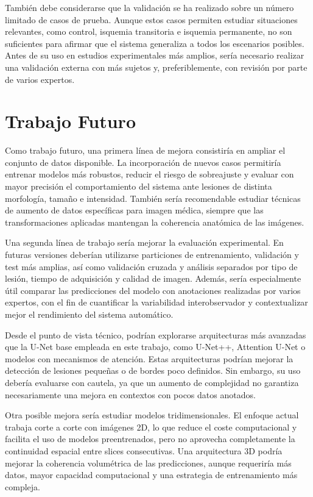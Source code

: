 También debe considerarse que la validación se ha realizado sobre un número limitado de casos de prueba. Aunque estos casos permiten estudiar situaciones relevantes, como
control, isquemia transitoria e isquemia permanente, no son suficientes para afirmar que el sistema generaliza a todos los escenarios posibles. Antes de su uso en estudios 
experimentales más amplios, sería necesario realizar una validación externa con más sujetos y, preferiblemente, con revisión por parte de varios expertos.

\section{Trabajo Futuro}

Como trabajo futuro, una primera línea de mejora consistiría en ampliar el conjunto de datos disponible. La incorporación de nuevos casos permitiría entrenar modelos más 
robustos, reducir el riesgo de sobreajuste y evaluar con mayor precisión el comportamiento del sistema ante lesiones de distinta morfología, tamaño e intensidad. También 
sería recomendable estudiar técnicas de aumento de datos específicas para imagen médica, siempre que las transformaciones aplicadas mantengan la coherencia anatómica de las imágenes.

Una segunda línea de trabajo sería mejorar la evaluación experimental. En futuras versiones deberían utilizarse particiones de entrenamiento, validación y test más amplias, 
así como validación cruzada y análisis separados por tipo de lesión, tiempo de adquisición y calidad de imagen. Además, sería especialmente útil comparar las predicciones del
modelo con anotaciones realizadas por varios expertos, con el fin de cuantificar la variabilidad interobservador y contextualizar mejor el rendimiento del sistema automático.

Desde el punto de vista técnico, podrían explorarse arquitecturas más avanzadas que la U-Net base empleada en este trabajo, como U-Net++, Attention U-Net o modelos con 
mecanismos de atención. Estas arquitecturas podrían mejorar la detección de lesiones pequeñas o de bordes poco definidos. Sin embargo, su uso debería evaluarse con cautela, 
ya que un aumento de complejidad no garantiza necesariamente una mejora en contextos con pocos datos anotados.

Otra posible mejora sería estudiar modelos tridimensionales. El enfoque actual trabaja corte a corte con imágenes 2D, lo que reduce el coste computacional y facilita el uso
de modelos preentrenados, pero no aprovecha completamente la continuidad espacial entre slices consecutivas. Una arquitectura 3D podría mejorar la coherencia volumétrica de 
las predicciones, aunque requeriría más datos, mayor capacidad computacional y una estrategia de entrenamiento más compleja.

